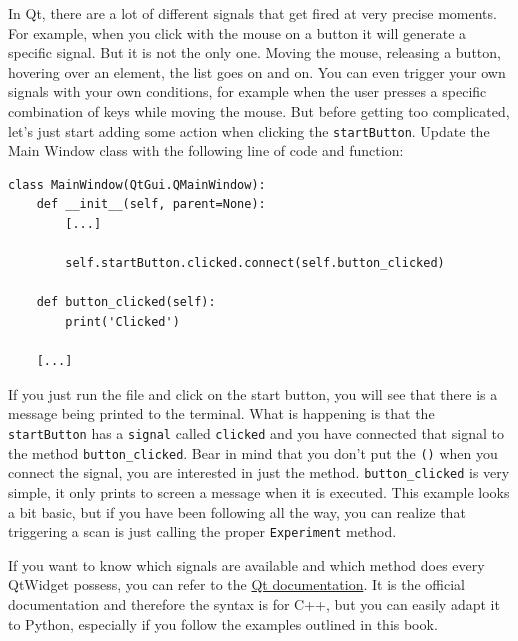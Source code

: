 In Qt, there are a lot of different signals that get fired at very
precise moments. For example, when you click with the mouse on a button
it will generate a specific signal. But it is not the only one. Moving
the mouse, releasing a button, hovering over an element, the list goes
on and on. You can even trigger your own signals with your own
conditions, for example when the user presses a specific combination of
keys while moving the mouse. But before getting too complicated, let's
just start adding some action when clicking the \texttt{startButton}.
Update the Main Window class with the following line of code and
function:

\begin{verbatim}
class MainWindow(QtGui.QMainWindow):
    def __init__(self, parent=None):
        [...]

        self.startButton.clicked.connect(self.button_clicked)

    def button_clicked(self):
        print('Clicked')

    [...]
\end{verbatim}

If you just run the file and click on the start button, you will see
that there is a message being printed to the terminal. What is happening
is that the \texttt{startButton} has a \texttt{signal} called
\texttt{clicked} and you have connected that signal to the method
\texttt{button_clicked}. Bear in mind that you don't put the
\texttt{()} when you connect the signal, you are interested in just the
method. \texttt{button_clicked} is very simple, it only prints to
screen a message when it is executed. This example looks a bit basic,
but if you have been following all the way, you can realize that
triggering a scan is just calling the proper \texttt{Experiment} method.


If you want to know which signals are available and which method does
every QtWidget possess, you can refer to the
\href{http://doc.qt.io/qt-5/qtwidgets-module.html}{Qt documentation}. It
is the official documentation and therefore the syntax is for C++, but
you can easily adapt it to Python, especially if you follow the examples
outlined in this book.

